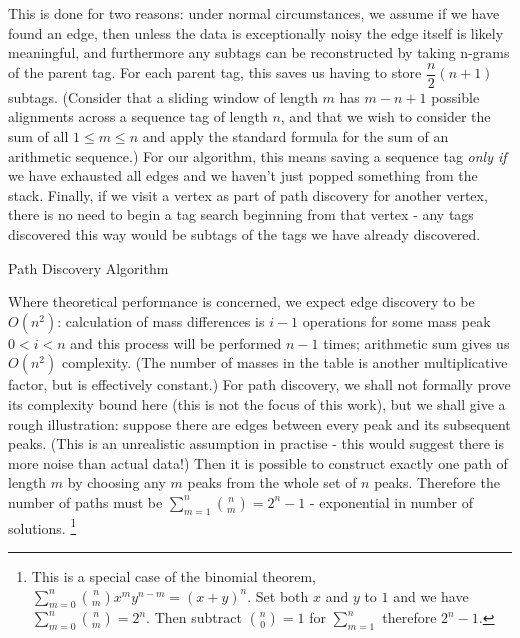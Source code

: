 \documentclass{l4proj}
\begin{document}
This is done for two reasons: under normal circumstances, we assume if we have found an edge, then unless the data is exceptionally noisy the edge itself is likely meaningful, and furthermore any subtags can be reconstructed by taking n-grams of the parent tag. For each parent tag, this saves us having to store \(\dfrac{n}{2}(n+1)\) subtags. (Consider that a sliding window of length \(m\) has \(m-n+1\) possible alignments across a sequence tag of length \(n\), and that we wish to consider the sum of all \(1 \leq m \leq n\) and apply the standard formula for the sum of an arithmetic sequence.) For our algorithm, this means saving a sequence tag \textit{only if} we have exhausted all edges and we haven't just popped something from the stack. Finally, if we visit a vertex as part of path discovery for another vertex, there is no need to begin a tag search beginning from that vertex - any tags discovered this way would be subtags of the tags we have already discovered.

\begin{algorithm}
    \DontPrintSemicolon

\caption{Path Discovery Algorithm}\label{alg:pathdesc}
\end{algorithm}

Where theoretical performance is concerned, we expect edge discovery to be \(O(n^2)\): calculation of mass differences is \(i-1\) operations for some mass peak \(0 < i < n\) and this process will be performed \(n-1\) times; arithmetic sum gives us \(O(n^2)\) complexity. (The number of masses in the table is another multiplicative factor, but is effectively constant.) For path discovery, we shall not formally prove its complexity bound here (this is not the focus of this work), but we shall give a rough illustration: suppose there are edges between every peak and its subsequent peaks. (This is an unrealistic assumption in practise - this would suggest there is more noise than actual data!) Then it is possible to construct exactly one path of length \(m\) by choosing any \(m\) peaks from the whole set of \(n\) peaks. Therefore the number of paths must be \(\sum_{m=1}^n\binom{n}{m} = 2^{n} - 1\) - exponential in number of solutions. \footnote{This is a special case of the binomial theorem, \(\sum_{m=0}^{n}\binom{n}{m}x^{m}y^{n-m} = (x+y)^n\). Set both \(x\) and \(y\) to \(1\) and we have \(\sum_{m=0}^{n}{\binom{n}{m}} = 2^n\). Then subtract \(\binom{n}{0} = 1\) for \(\sum_{m=1}^{n}\) therefore \(2^n - 1\).} 
\end{document}

